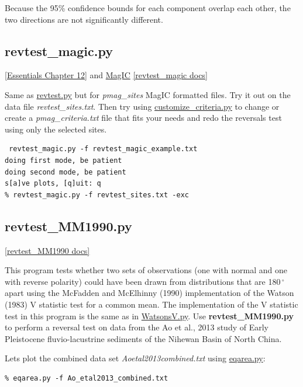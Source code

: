 \documentclass[11pt]{book}
\begin{document}
{{Because the 95\% confidence bounds for each component overlap each other, the two directions are not significantly different.


\subsection{revtest\_magic.py}
\href{http://earthref.org/MAGIC/books/Tauxe/Essentials/WebBook3ch12.html#ch12}{ [Essentials Chapter 12]} and \href{#MagIC}{MagIC}
\href{https://github.com/PmagPy/PmagPy/blob/master/programs/revtest_magic.py}{[revtest\_magic docs]}

Same as \href{#revtest.py}{revtest.py} but for {\it pmag\_sites} MagIC formatted files.   Try it out on the data file {\it revtest\_sites.txt}.  Then try using \href{#customize_criteria.py}{customize\_criteria.py} to change or create a {\it pmag\_criteria.txt} file that fits your needs and redo the reversals test using only the selected sites.

\begin{verbatim}
 revtest_magic.py -f revtest_magic_example.txt
doing first mode, be patient
doing second mode, be patient
s[a]ve plots, [q]uit: q
% revtest_magic.py -f revtest_sites.txt -exc
\end{verbatim}

\subsection{revtest\_MM1990.py}
\href{https://github.com/PmagPy/PmagPy/blob/master/programs/revtest_MM1990.py}{[revtest\_MM1990 docs]}

This program tests whether two sets of observations (one with normal and one with reverse polarity) could have been drawn from distributions that are 180$\,^{\circ}$ apart using the McFadden and McElhinny (1990) implementation of the Watson (1983) V statistic test for a common mean. The implementation of the V statistic test in this program is the same as in \href{#WatsonsV.py}{WatsonsV.py}. Use \textbf{revtest\_MM1990.py} to perform a reversal test on data from the Ao et al., 2013 study of Early Pleistocene fluvio-lacustrine sediments of the Nihewan Basin of North China.

Lets plot the combined data set \textit{Ao\textunderscore etal2013\textunderscore combined.txt} using \href{#eqarea.py}{eqarea.py}:

\begin{verbatim}
% eqarea.py -f Ao_etal2013_combined.txt
\end{verbatim}

}}
\end{document}
